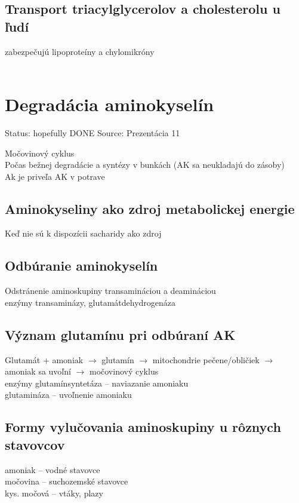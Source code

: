 \subsection*{Transport triacylglycerolov a cholesterolu u ľudí}
zabezpečujú lipoproteíny a chylomikróny\\
\\

\section{Degradácia aminokyselín}

Status: hopefully DONE
Source: Prezentácia 11

Močovinový cyklus\\
Počas bežnej degradácie a syntézy v bunkách (AK sa neukladajú do zásoby)\\
Ak je priveľa AK v potrave\\
\subsection*{Aminokyseliny ako zdroj metabolickej energie}
Keď nie sú k dispozícii sacharidy ako zdroj\\
\subsection*{Odbúranie aminokyselín}
Odstránenie aminoskupiny transamináciou a deamináciou\\
enzýmy transaminázy, glutamátdehydrogenáza\\
\subsection*{Význam glutamínu pri odbúraní AK}
Glutamát + amoniak $\rightarrow$ glutamín $\rightarrow$ mitochondrie pečene/obličiek $\rightarrow$ amoniak sa uvoľní $\rightarrow$ močovinový cyklus\\
enzýmy glutamínsyntetáza -- naviazanie amoniaku\\
glutamináza -- uvoľnenie amoniaku\\
\subsection*{Formy vylučovania aminoskupiny u rôznych stavovcov}
amoniak -- vodné stavovce\\
močovina -- suchozemské stavovce\\
kys. močová -- vtáky, plazy\\
